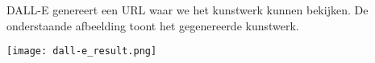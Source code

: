 DALL-E genereert een URL waar we het kunstwerk kunnen bekijken. De onderstaande afbeelding toont het gegenereerde kunstwerk.

\begin{center}
    \texttt{[image: dall-e\_result.png]}
    \label{fig:dall-e_result}
\end{center}

